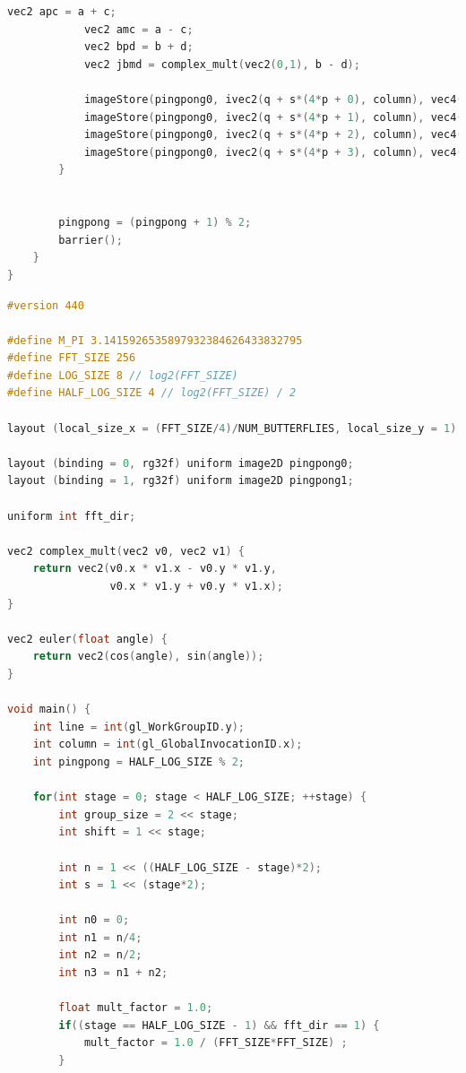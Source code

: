 \documentclass[
  oneside,
  11pt, a4paper,
  footinclude=true,
  headinclude=true,
  cleardoublepage=empty
]{scrbook}
\begin{document}
\begin{lstlisting}[language=C, caption={FFT Radix-4 Stockham Horizontal unique pass, see \autoref{subsec:radix4-stockham}}, label={lst:glsl-radix4-stockham-horizontal}]
            vec2 apc = a + c;
            vec2 amc = a - c;
            vec2 bpd = b + d;
            vec2 jbmd = complex_mult(vec2(0,1), b - d);

            imageStore(pingpong0, ivec2(q + s*(4*p + 0), column), vec4(apc + bpd, 0,0));
            imageStore(pingpong0, ivec2(q + s*(4*p + 1), column), vec4(complex_mult(w1p, amc + jbmd*fft_dir), 0,0));
            imageStore(pingpong0, ivec2(q + s*(4*p + 2), column), vec4(complex_mult(w2p, apc - bpd ), 0,0));
            imageStore(pingpong0, ivec2(q + s*(4*p + 3), column), vec4(complex_mult(w3p, amc - jbmd*fft_dir), 0,0));
        }
        

        pingpong = (pingpong + 1) % 2;
        barrier();
    }
}
\end{lstlisting}

\begin{lstlisting}[language=C, caption={FFT Radix-4 Stockham Vertical unique pass, see \autoref{subsec:radix4-stockham}}, label={lst:glsl-radix4-stockham-vertical}]
#version 440

#define M_PI 3.1415926535897932384626433832795
#define FFT_SIZE 256
#define LOG_SIZE 8 // log2(FFT_SIZE)
#define HALF_LOG_SIZE 4 // log2(FFT_SIZE) / 2

layout (local_size_x = (FFT_SIZE/4)/NUM_BUTTERFLIES, local_size_y = 1) in;

layout (binding = 0, rg32f) uniform image2D pingpong0;
layout (binding = 1, rg32f) uniform image2D pingpong1;

uniform int fft_dir;

vec2 complex_mult(vec2 v0, vec2 v1) {
	return vec2(v0.x * v1.x - v0.y * v1.y,
				v0.x * v1.y + v0.y * v1.x);
}

vec2 euler(float angle) {
	return vec2(cos(angle), sin(angle));
}

void main() {
	int line = int(gl_WorkGroupID.y);
	int column = int(gl_GlobalInvocationID.x);
    int pingpong = HALF_LOG_SIZE % 2;

    for(int stage = 0; stage < HALF_LOG_SIZE; ++stage) {
        int group_size = 2 << stage;
        int shift = 1 << stage;

        int n = 1 << ((HALF_LOG_SIZE - stage)*2);
        int s = 1 << (stage*2);

        int n0 = 0;
        int n1 = n/4;
        int n2 = n/2;
        int n3 = n1 + n2;

	    float mult_factor = 1.0;
	    if((stage == HALF_LOG_SIZE - 1) && fft_dir == 1) {
	    	mult_factor = 1.0 / (FFT_SIZE*FFT_SIZE) ;
	    }


\end{lstlisting}
\end{document}
